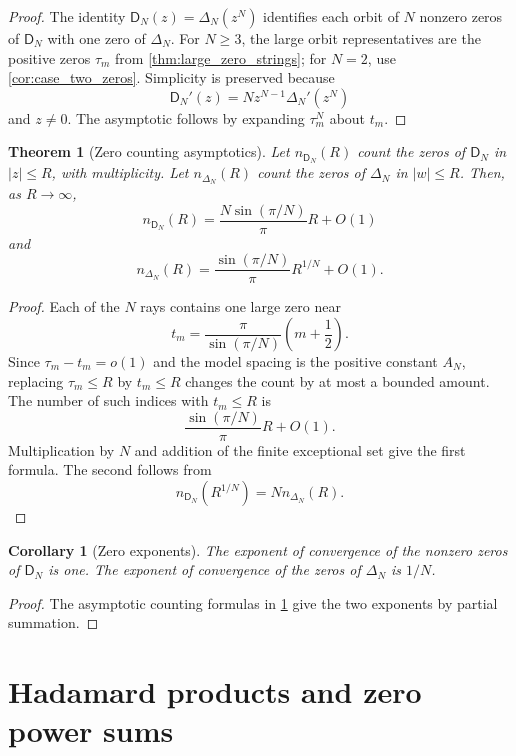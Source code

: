 \documentclass[11pt]{article}
\newtheorem{theorem}{Theorem}[section]
\newtheorem{corollary}[corollary]{Corollary}
\theoremstyle{definition}
\theoremstyle{remark}
\newcommand{\Dfun}{\mathsf D}
\begin{document}
\begin{proof}
The identity $\Dfun_N(z)=\Delta_N(z^N)$ identifies each orbit of $N$ nonzero zeros of $\Dfun_N$ with one zero of $\Delta_N$.  For $N\geq3$, the large orbit representatives are the positive zeros $\tau_m$ from \cref{thm:large_zero_strings}; for $N=2$, use \cref{cor:case_two_zeros}.  Simplicity is preserved because
\[
\Dfun_N'(z)=Nz^{N-1}\Delta_N'(z^N)
\]
and $z\ne0$.  The asymptotic follows by expanding $\tau_m^N$ about $t_m$.
\end{proof}

\begin{theorem}[Zero counting asymptotics]\label{thm:zero_counting}
Let $n_{\Dfun_N}(R)$ count the zeros of $\Dfun_N$ in $|z|\leq R$, with multiplicity.  Let $n_{\Delta_N}(R)$ count the zeros of $\Delta_N$ in $|w|\leq R$.  Then, as $R\to\infty$,
\[
n_{\Dfun_N}(R)
=
\frac{N\sin(\pi/N)}{\pi}R+O(1)
\]
and
\[
n_{\Delta_N}(R)
=
\frac{\sin(\pi/N)}{\pi}R^{1/N}+O(1).
\]
\end{theorem}

\begin{proof}
Each of the $N$ rays contains one large zero near
\[
 t_m=\frac\pi{\sin(\pi/N)}\left(m+\frac12\right).
\]
Since $\tau_m-t_m=o(1)$ and the model spacing is the positive constant
$A_N$, replacing $\tau_m\leq R$ by $t_m\leq R$ changes the count by at
most a bounded amount.
The number of such indices with $t_m\leq R$ is
\[
\frac{\sin(\pi/N)}\pi R+O(1).
\]
Multiplication by $N$ and addition of the finite exceptional set give the first formula.  The second follows from
\[
n_{\Dfun_N}(R^{1/N})=Nn_{\Delta_N}(R).
\]
\end{proof}


\begin{corollary}[Zero exponents]\label{cor:exponent_of_convergence}
The exponent of convergence of the nonzero zeros of $\Dfun_N$ is one.  The exponent of convergence of the zeros of $\Delta_N$ is $1/N$.
\end{corollary}

\begin{proof}
The asymptotic counting formulas in \cref{thm:zero_counting} give the two exponents by partial summation.
\end{proof}

\section{Hadamard products and zero power sums}\label{sec:hadamard}
\end{document}
